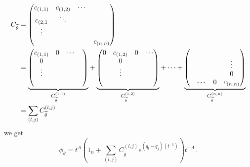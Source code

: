 \begin{align*}
  C_{\tilde\theta}&=\begin{pmatrix}
    c_{(1,1)} & c_{(1,2)} & \cdots &\\
    c_{(2,1} & \ddots\\
    \vdots \\
    & & & c_{(n,n)}
  \end{pmatrix}
\\&=
  \underset{C_{\tilde\theta}^{(1,1)}}{\underbrace{%
    \begin{pmatrix}
      c_{(1,1)} & 0 & \cdots &\\
      0\\
      \vdots&\\
      &
    \end{pmatrix}
  }}
  +
  \underset{C_{\tilde\theta}^{(1,2)}}{\underbrace{%
    \begin{pmatrix}
      0 & c_{(1,2)} & 0 & \cdots\\
      & 0 &\\
      &\vdots\\
      &
    \end{pmatrix}
  }}
  +\cdots+
  \underset{C_{\tilde\theta}^{(n,n)}}{\underbrace{%
    \begin{pmatrix}
      &\\
      & & & \vdots\\
      & & & 0\\
      & \cdots & 0 & c_{(n,n)}
    \end{pmatrix}
  }}
\\&=\sum_{(l,j)}C_{\tilde\theta}^{(l,j)}
\end{align*}
we get
\[
  \phi_\theta=
    t^\Lambda\left(
      1_n+\sum_{(l,j)}C_{\tilde\theta}^{(l,j)}e^{(q_l-q_j)(t^{-1})}
    \right)t^{-\Lambda} \,.
\]

